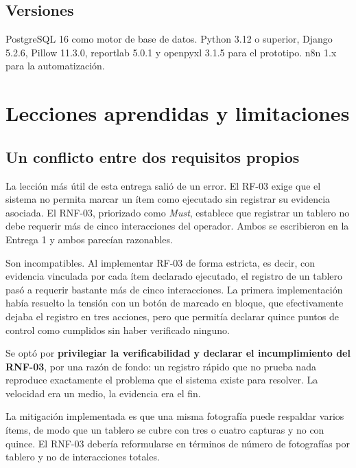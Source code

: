 \documentclass[10pt,letterpaper]{article}
\begin{document}
\subsection{Versiones}

PostgreSQL 16 como motor de base de datos. Python 3.12 o superior, Django
5.2.6, Pillow 11.3.0, reportlab 5.0.1 y openpyxl 3.1.5 para el prototipo. n8n
1.x para la automatización.

\newpage

\section{Lecciones aprendidas y limitaciones}

\subsection{Un conflicto entre dos requisitos propios}

La lección más útil de esta entrega salió de un error.
El RF-03 exige que el sistema no permita marcar un ítem como ejecutado sin
registrar su evidencia asociada. El RNF-03, priorizado como \emph{Must},
establece que registrar un tablero no debe requerir más de cinco interacciones del operador. Ambos se escribieron en la Entrega 1 y ambos parecían razonables.

Son incompatibles. Al implementar RF-03 de forma estricta, es decir, con evidencia vinculada por cada ítem declarado ejecutado, el registro de un tablero pasó a requerir bastante más de cinco interacciones. La primera implementación había resuelto la tensión con un botón de marcado en bloque, que efectivamente dejaba el registro en tres acciones, pero que permitía declarar quince puntos de control como cumplidos sin haber verificado ninguno.

Se optó por \textbf{privilegiar la verificabilidad y declarar el incumplimiento del RNF-03}, por una razón de fondo: un registro rápido que no prueba nada reproduce exactamente el problema que el sistema existe para resolver. La velocidad era un medio, la evidencia era el fin.

La mitigación implementada es que una misma fotografía puede respaldar varios ítems, de modo que un tablero se cubre con tres o cuatro capturas y no con quince. El RNF-03 debería reformularse en términos de número de fotografías por tablero y no de interacciones totales.
\end{document}
